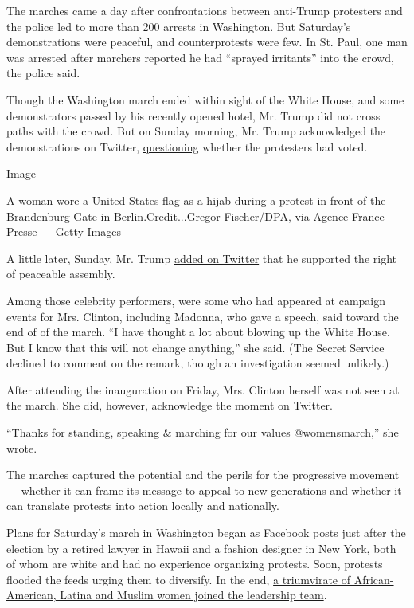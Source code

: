 The marches came a day after confrontations between anti-Trump
protesters and the police led to more than 200 arrests in Washington.
But Saturday's demonstrations were peaceful, and counterprotests were
few. In St. Paul, one man was arrested after marchers reported he had
``sprayed irritants'' into the crowd, the police said.

Though the Washington march ended within sight of the White House, and
some demonstrators passed by his recently opened hotel, Mr. Trump did
not cross paths with the crowd. But on Sunday morning, Mr. Trump
acknowledged the demonstrations on Twitter,
\href{https://twitter.com/realDonaldTrump/status/823150055418920960}{questioning}
whether the protesters had voted.

Image

A woman wore a United States flag as a hijab during a protest in front
of the Brandenburg Gate in Berlin.Credit...Gregor Fischer/DPA, via
Agence France-Presse --- Getty Images

A little later, Sunday, Mr. Trump
\href{https://twitter.com/realDonaldTrump/status/823174199036542980}{added
on Twitter} that he supported the right of peaceable assembly.

Among those celebrity performers, were some who had appeared at campaign
events for Mrs. Clinton, including Madonna, who gave a speech, said
toward the end of of the march. ``I have thought a lot about blowing up
the White House. But I know that this will not change anything,'' she
said. (The Secret Service declined to comment on the remark, though an
investigation seemed unlikely.)

After attending the inauguration on Friday, Mrs. Clinton herself was not
seen at the march. She did, however, acknowledge the moment on Twitter.

``Thanks for standing, speaking \& marching for our values
@womensmarch,'' she wrote.

The marches captured the potential and the perils for the progressive
movement --- whether it can frame its message to appeal to new
generations and whether it can translate protests into action locally
and nationally.

Plans for Saturday's march in Washington began as Facebook posts just
after the election by a retired lawyer in Hawaii and a fashion designer
in New York, both of whom are white and had no experience organizing
protests. Soon, protests flooded the feeds urging them to diversify. In
the end,
\href{https://www.nytimes.com/2017/01/09/us/womens-march-on-washington-opens-contentious-dialogues-about-race.html}{a
triumvirate of African-American, Latina and Muslim women joined the
leadership team}.

